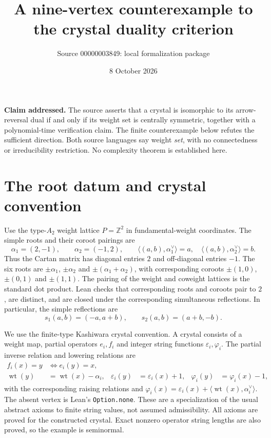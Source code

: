 \documentclass[11pt,a4paper]{article}
\title{A nine-vertex counterexample to the crystal duality criterion}
\author{Source 00000003849: local formalization package}
\date{8 October 2026}
\newcommand{\Z}{\mathbb Z}
\newcommand{\wt}{\operatorname{wt}}
\newcommand{\eps}{\varepsilon}
\begin{document}
\maketitle

\noindent\textbf{Claim addressed.} The source asserts that a crystal is
isomorphic to its arrow-reversal dual if and only if its weight set is centrally
symmetric, together with a polynomial-time verification claim. The finite
counterexample below refutes the sufficient direction. Both source languages
say weight \emph{set}, with no connectedness or irreducibility restriction.
No complexity theorem is established here.

\section*{The root datum and crystal convention}
Use the type-$A_2$ weight lattice $P=\Z^2$ in fundamental-weight coordinates.
The simple roots and their coroot pairings are
\[
 \alpha_1=(2,-1),\qquad \alpha_2=(-1,2),\qquad
 \langle(a,b),\alpha_1^\vee\rangle=a,\quad
 \langle(a,b),\alpha_2^\vee\rangle=b.
\]
Thus the Cartan matrix has diagonal entries $2$ and off-diagonal entries $-1$.
The six roots are $\pm\alpha_1$, $\pm\alpha_2$ and
$\pm(\alpha_1+\alpha_2)$, with corresponding coroots
$\pm(1,0)$, $\pm(0,1)$ and $\pm(1,1)$. The pairing of the weight and coweight
lattices is the standard dot product. Lean checks that corresponding roots and
coroots pair to $2$, are distinct, and are closed under the corresponding
simultaneous reflections. In particular, the simple reflections are
\[
 s_1(a,b)=(-a,a+b),\qquad s_2(a,b)=(a+b,-b).
\]

We use the finite-type Kashiwara crystal convention. A crystal consists of a
weight map, partial operators $e_i,f_i$ and integer string functions
$\eps_i,\varphi_i$. The partial inverse relation and lowering relations are
\begin{align*}
 f_i(x)=y&\iff e_i(y)=x,\\
 \wt(y)&=\wt(x)-\alpha_i, &
 \eps_i(y)&=\eps_i(x)+1, &
 \varphi_i(y)&=\varphi_i(x)-1,
\end{align*}
with the corresponding raising relations and
$\varphi_i(x)=\eps_i(x)+\langle\wt(x),\alpha_i^\vee\rangle$.
The absent vertex is Lean's \texttt{Option.none}. These are a specialization of
the usual abstract axioms to finite string values, not assumed admissibility.
All axioms are proved for the constructed crystal. Exact nonzero operator
string lengths are also proved, so the example is seminormal.
\end{document}
